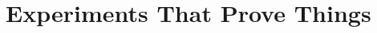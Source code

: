 
\def\chapdir{./ChapterExperiments}

\chapter{Experiments That Prove Things}\label{ch:experiments}








